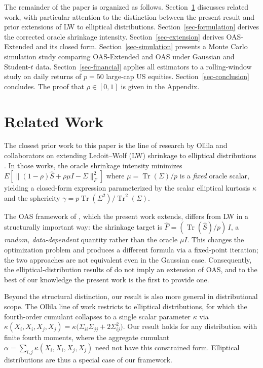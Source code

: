 \documentclass[10pt,twoside,titlepage]{article}
\begin{document}
The remainder of the paper is organized as follows.
Section~\ref{sec-related} discusses related work, with particular attention to the
distinction between the present result and prior extensions of LW to elliptical
distributions.
Section~\ref{sec-formulation} derives the corrected oracle shrinkage intensity.
Section~\ref{sec-extension} derives OAS-Extended and its closed form.
Section~\ref{sec-simulation} presents a Monte Carlo simulation study comparing
OAS-Extended and OAS under Gaussian and Student-$t$ data.
Section~\ref{sec-financial} applies all estimators to a rolling-window study on
daily returns of $p=50$ large-cap US equities.
Section~\ref{sec-conclusion} concludes.
The proof that $\rho \in [0,1]$ is given in the Appendix.

\section{Related Work}\label{sec-related}

The closest prior work to this paper is the line of research by Ollila and collaborators
on extending Ledoit--Wolf (LW) shrinkage \cite{LW2004} to elliptical distributions
\cite{Ollila2017, OllilaRaninen2019, Ollila2023}.
In those works, the oracle shrinkage intensity minimizes
$E\left[\lVert (1-\rho)\hat{S} + \rho\mu I - \Sigma \rVert_F^2\right]$
where $\mu = \operatorname{Tr}(\Sigma)/p$ is a \emph{fixed} oracle scalar, yielding a
closed-form expression parameterized by the scalar elliptical kurtosis $\kappa$ and the
sphericity $\gamma = p\operatorname{Tr}(\Sigma^2)/\operatorname{Tr}^2(\Sigma)$.

The OAS framework of \cite{OAS}, which the present work extends, differs from LW in a
structurally important way: the shrinkage target is
$\hat{F} = (\operatorname{Tr}(\hat{S})/p)\,I$, a \emph{random, data-dependent} quantity
rather than the oracle $\mu I$.
This changes the optimization problem and produces a different formula via a fixed-point
iteration; the two approaches are not equivalent even in the Gaussian case.
Consequently, the elliptical-distribution results of \cite{Ollila2017, OllilaRaninen2019}
do not imply an extension of OAS, and to the best of our knowledge the present work is
the first to provide one.

Beyond the structural distinction, our result is also more general in distributional scope.
The Ollila line of work restricts to elliptical distributions, for which the fourth-order
cumulant collapses to a single scalar parameter $\kappa$ via
$\kappa(X_i, X_i, X_j, X_j) = \kappa\bigl(\Sigma_{ii}\Sigma_{jj} + 2\Sigma_{ij}^2\bigr)$.
Our result holds for any distribution with finite fourth moments, where the aggregate cumulant
$\alpha = \sum_{i,j} \kappa(X_i, X_i, X_j, X_j)$ need not have this constrained form.
Elliptical distributions are thus a special case of our framework.
\end{document}
